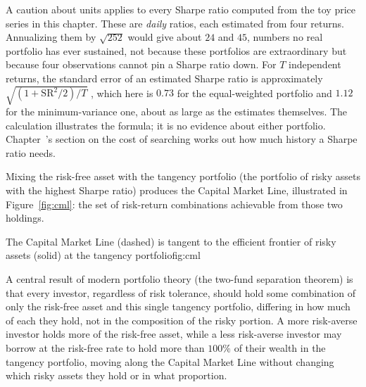 \documentclass[../ai_in_finance]{subfiles}
\begin{document}
A caution about units applies to every Sharpe ratio computed from the toy price series in this chapter. These are \emph{daily} ratios, each estimated from four returns. Annualizing them by $\sqrt{252}$ would give about $24$ and $45$, numbers no real portfolio has ever sustained, not because these portfolios are extraordinary but because four observations cannot pin a Sharpe ratio down. For $T$ independent returns, the standard error of an estimated Sharpe ratio is approximately $\sqrt{(1+\text{SR}^2/2)/T}$ \parencite{lo2002statistics}, which here is $0.73$ for the equal-weighted portfolio and $1.12$ for the minimum-variance one, about as large as the estimates themselves. The calculation illustrates the formula; it is no evidence about either portfolio. Chapter~'s section on the cost of searching works out how much history a Sharpe ratio needs.

Mixing the risk-free asset with the tangency portfolio (the portfolio of risky assets with the highest Sharpe ratio) produces the Capital Market Line, illustrated in Figure~\ref{fig:cml}: the set of risk-return combinations achievable from those two holdings.

\begin{bookfigure}[htbp]{The Capital Market Line (dashed) is tangent to the efficient frontier of risky assets (solid) at the tangency portfolio}{fig:cml}
\end{bookfigure}

A central result of modern portfolio theory (the two-fund separation theorem) is that every investor, regardless of risk tolerance, should hold some combination of only the risk-free asset and this single tangency portfolio, differing in how much of each they hold, not in the composition of the risky portion.
A more risk-averse investor holds more of the risk-free asset, while a less risk-averse investor may borrow at the risk-free rate to hold more than $100\%$ of their wealth in the tangency portfolio, moving along the Capital Market Line without changing which risky assets they hold or in what proportion.
\end{document}
